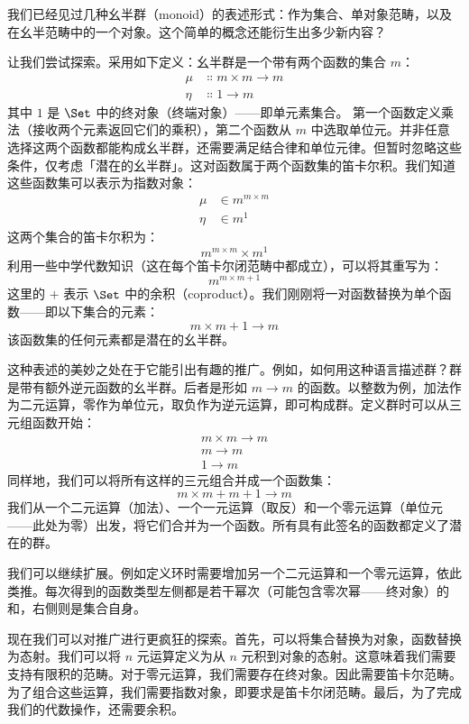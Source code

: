 
\lettrine[lhang=0.17]{我}{们已经见过几种幺半群}（monoid）的表述形式：作为集合、单对象范畴，以及在幺半范畴中的一个对象。这个简单的概念还能衍生出多少新内容？

让我们尝试探索。采用如下定义：幺半群是一个带有两个函数的集合 $m$：
\begin{align*}
  \mu  & \Colon m\times{}m \to m \\
  \eta & \Colon 1 \to m
\end{align*}
其中 $1$ 是 $\Set$ 中的终对象（终端对象）——即单元素集合。
第一个函数定义乘法（接收两个元素返回它们的乘积），第二个函数从 $m$ 中选取单位元。并非任意选择这两个函数都能构成幺半群，还需要满足结合律和单位元律。但暂时忽略这些条件，仅考虑「潜在的幺半群」。这对函数属于两个函数集的笛卡尔积。我们知道这些函数集可以表示为指数对象：
\begin{align*}
  \mu  & \in m^{m\times{}m} \\
  \eta & \in m^1
\end{align*}
这两个集合的笛卡尔积为：
$$m^{m\times{}m}\times{}m^1$$
利用一些中学代数知识（这在每个笛卡尔闭范畴中都成立），可以将其重写为：
$$m^{m\times{}m + 1}$$
这里的 $+$ 表示 $\Set$ 中的余积（coproduct）。我们刚刚将一对函数替换为单个函数——即以下集合的元素：
$$m\times{}m + 1 \to m$$
该函数集的任何元素都是潜在的幺半群。

这种表述的美妙之处在于它能引出有趣的推广。例如，如何用这种语言描述群？群是带有额外逆元函数的幺半群。后者是形如 $m \to m$ 的函数。以整数为例，加法作为二元运算，零作为单位元，取负作为逆元运算，即可构成群。定义群时可以从三元组函数开始：
\begin{align*}
  m\times{}m \to m \\
  m \to m          \\
  1 \to m
\end{align*}
同样地，我们可以将所有这样的三元组合并成一个函数集：
$$m\times{}m + m + 1 \to m$$
我们从一个二元运算（加法）、一个一元运算（取反）和一个零元运算（单位元——此处为零）出发，将它们合并为一个函数。所有具有此签名的函数都定义了潜在的群。

我们可以继续扩展。例如定义环时需要增加另一个二元运算和一个零元运算，依此类推。每次得到的函数类型左侧都是若干幂次（可能包含零次幂——终对象）的和，右侧则是集合自身。

现在我们可以对推广进行更疯狂的探索。首先，可以将集合替换为对象，函数替换为态射。我们可以将 $n$ 元运算定义为从 $n$ 元积到对象的态射。这意味着我们需要支持有限积的范畴。对于零元运算，我们需要存在终对象。因此需要笛卡尔范畴。为了组合这些运算，我们需要指数对象，即要求是笛卡尔闭范畴。最后，为了完成我们的代数操作，还需要余积。

